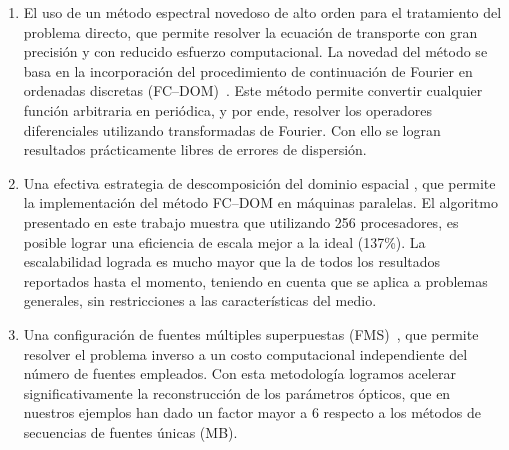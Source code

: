 \begin{enumerate}
\item El uso de un método espectral novedoso de alto orden
para el tratamiento del problema directo, que permite resolver la 
ecuación de transporte con gran precisión y con reducido esfuerzo 
computacional. La novedad del método se basa en la incorporación 
del procedimiento de continuación de Fourier 
en ordenadas discretas (FC--DOM)~\cite{Gaggioli2019}. 
Este método permite convertir cualquier función arbitraria en periódica, y 
por ende, resolver los operadores diferenciales utilizando transformadas 
de Fourier. Con ello se logran resultados prácticamente libres de 
errores de dispersión.

\item Una efectiva estrategia de descomposición del dominio espacial 
\cite{Gaggioli2022}, 
que permite la implementación del método FC--DOM en máquinas paralelas. 
El algoritmo presentado en este trabajo muestra que utilizando 
256 procesadores, es posible lograr una eficiencia de escala 
mejor a la ideal (137\%). 
La escalabilidad lograda es mucho mayor que la de todos los 
resultados reportados hasta el momento, teniendo en cuenta que 
se aplica a problemas generales, sin restricciones a las 
características del medio.

\item Una configuración de fuentes múltiples superpuestas (FMS)~\cite{Gaggioli2022}, 
que permite resolver el problema inverso a un costo computacional 
independiente del número de fuentes empleados. 
Con esta metodología logramos acelerar significativamente la reconstrucción 
de los parámetros ópticos, que en nuestros ejemplos han dado un factor mayor a 6 
respecto a los métodos de secuencias de fuentes únicas (MB).

\end{enumerate}

